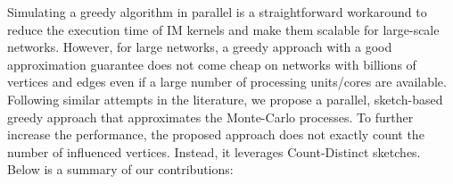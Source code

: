 \documentclass[10pt,journal,compsoc]{IEEEtran}
\begin{document}
 

Simulating a greedy algorithm in parallel is a straightforward workaround to reduce the execution time of IM kernels and make them scalable for large-scale networks. However, for large networks, a greedy approach with a good approximation guarantee does not come cheap on networks with billions of vertices and edges even if a large number of processing units/cores are available. Following similar attempts in the literature, we propose a parallel, sketch-based greedy approach that approximates the Monte-Carlo processes. To further increase the performance, the proposed approach does not exactly count the number of influenced vertices. Instead, it leverages Count-Distinct sketches. Below is a summary of our contributions:
\end{document}
